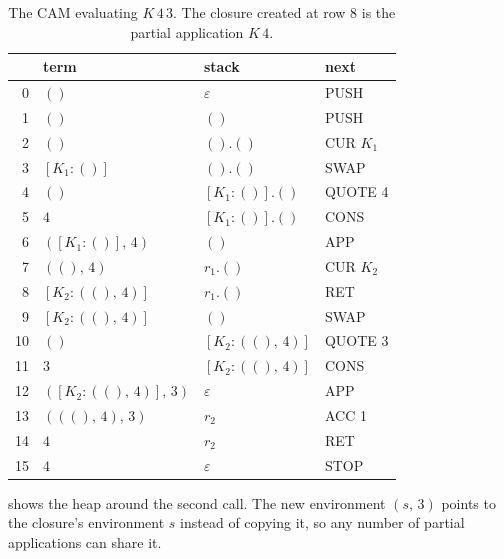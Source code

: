 \documentclass[11pt,a4paper]{article}
\newcommand{\ins}[1]{\textsf{#1}}
\newcommand{\clo}[2]{[#1 : #2]}
\newcommand{\pr}[2]{(#1,\, #2)}
\newcommand{\unit}{()}
\theoremstyle{definition}
\theoremstyle{plain}
\begin{document}
\begin{table}[t]
\centering
\small
\begin{tabular}{@{}r l l l@{}}
\toprule
& term & stack & next\\
\midrule
0 & $\unit$ & $\varepsilon$ & \ins{PUSH}\\
1 & $\unit$ & $\unit$ & \ins{PUSH}\\
2 & $\unit$ & $\unit.\unit$ & \ins{CUR} $K_1$\\
3 & $\clo{K_1}{\unit}$ & $\unit.\unit$ & \ins{SWAP}\\
4 & $\unit$ & $\clo{K_1}{\unit}.\unit$ & \ins{QUOTE} 4\\
5 & $4$ & $\clo{K_1}{\unit}.\unit$ & \ins{CONS}\\
6 & $\pr{\clo{K_1}{\unit}}{4}$ & $\unit$ & \ins{APP}\\
7 & $\pr{\unit}{4}$ & $r_1.\unit$ & \ins{CUR} $K_2$\\
8 & $\clo{K_2}{\pr{\unit}{4}}$ & $r_1.\unit$ & \ins{RET}\\
9 & $\clo{K_2}{\pr{\unit}{4}}$ & $\unit$ & \ins{SWAP}\\
10 & $\unit$ & $\clo{K_2}{\pr{\unit}{4}}$ & \ins{QUOTE} 3\\
11 & $3$ & $\clo{K_2}{\pr{\unit}{4}}$ & \ins{CONS}\\
12 & $\pr{\clo{K_2}{\pr{\unit}{4}}}{3}$ & $\varepsilon$ & \ins{APP}\\
13 & $\pr{\pr{\unit}{4}}{3}$ & $r_2$ & \ins{ACC} 1\\
14 & $4$ & $r_2$ & \ins{RET}\\
15 & $4$ & $\varepsilon$ & \ins{STOP}\\
\bottomrule
\end{tabular}
\caption{The CAM evaluating $K\,4\,3$. The closure created at row 8 is the
partial application $K\,4$.}
\label{tab:trace2}
\end{table}

 shows the heap around the second call. The new environment
$\pr{s}{3}$ points to the closure's environment $s$ instead of copying it, so
any number of partial applications can share it.
\end{document}
